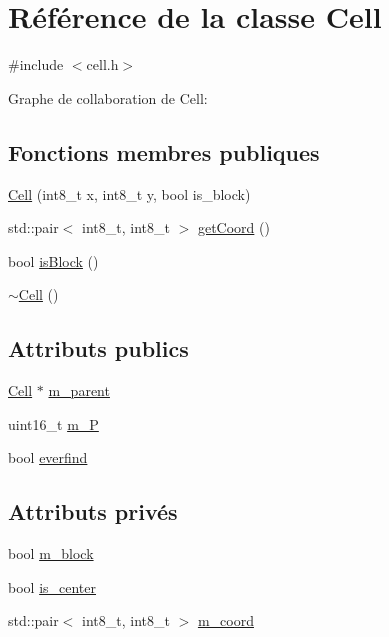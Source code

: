 \hypertarget{class_cell}{\section{Référence de la classe Cell}
\label{class_cell}
}


{\ttfamily \#include $<$cell.\-h$>$}



Graphe de collaboration de Cell\-:
\subsection*{Fonctions membres publiques}
\begin{DoxyCompactItemize}
\item 
\hyperlink{class_cell_aa773f7eb4e9ae0985291bf5332570f37}{Cell} (int8\-\_\-t x, int8\-\_\-t y, bool is\-\_\-block)
\item 
std\-::pair$<$ int8\-\_\-t, int8\-\_\-t $>$ \hyperlink{class_cell_a6cb8051b31ce00b7a7f2cc1b6e14d6a4}{get\-Coord} ()
\item 
bool \hyperlink{class_cell_aa7cf3f2e7c09c75764d8934d530c4863}{is\-Block} ()
\item 
\hyperlink{class_cell_a9fa559f7a28e2b4336c6879ca09304d8}{$\sim$\-Cell} ()
\end{DoxyCompactItemize}
\subsection*{Attributs publics}
\begin{DoxyCompactItemize}
\item 
\hyperlink{class_cell}{Cell} $\ast$ \hyperlink{class_cell_a1d30ec2a94e3ba2bec541d978f55c9bc}{m\-\_\-parent}
\item 
uint16\-\_\-t \hyperlink{class_cell_aa47b258f5356e76a577a5035b6e1cf59}{m\-\_\-\-P}
\item 
bool \hyperlink{class_cell_a1c2a62d76f46eb90b5d128fe30286e51}{everfind}
\end{DoxyCompactItemize}
\subsection*{Attributs privés}
\begin{DoxyCompactItemize}
\item 
bool \hyperlink{class_cell_a9b50a43a58f4797a912186b6f60193f9}{m\-\_\-block}
\item 
bool \hyperlink{class_cell_a38638c9eb588c8cd2e11f21e762a0d84}{is\-\_\-center}
\item 
std\-::pair$<$ int8\-\_\-t, int8\-\_\-t $>$ \hyperlink{class_cell_a085171fb910218539ba90994051f2156}{m\-\_\-coord}
\end{DoxyCompactItemize}


